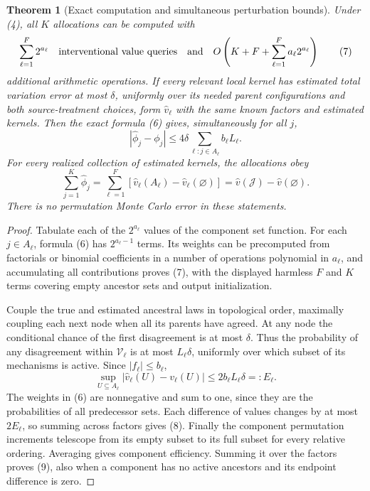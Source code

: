 \documentclass[11pt]{article}
\newtheorem{theorem}{Theorem}
\theoremstyle{definition}
\begin{document}
\begin{theorem}[Exact computation and simultaneous perturbation bounds]
Under (4), all $K$ allocations can be computed with
\[
 \sum_{\ell=1}^F 2^{a_\ell}\quad\hbox{interventional value queries}
 \quad\hbox{and}\quad
 O\left(K+F+\sum_{\ell=1}^F a_\ell2^{a_\ell}\right)
                                                        \tag{7}
\]
additional arithmetic operations. If every relevant local kernel has
estimated total variation error at most $\delta$, uniformly over its
needed parent configurations and both source-treatment choices, form
$\widehat v_\ell$ with the same known factors and estimated kernels.
Then the exact formula (6) gives, simultaneously for all $j$,
\[
 |\widehat\phi_j-\phi_j|
 \le4\delta\sum_{\ell:j\in A_\ell}b_\ell L_\ell.    \tag{8}
\]
For every realized collection of estimated kernels, the allocations obey
\[
 \sum_{j=1}^K\widehat\phi_j
 =\sum_{\ell=1}^F[\widehat v_\ell(A_\ell)
                         -\widehat v_\ell(\varnothing)]
 =\widehat v(\mathcal J)-\widehat v(\varnothing).       \tag{9}
\]
There is no permutation Monte Carlo error in these statements.
\end{theorem}
\begin{proof}
Tabulate each of the $2^{a_\ell}$ values of the component set function.
For each $j\in A_\ell$, formula (6) has $2^{a_\ell-1}$ terms.
Its weights can be precomputed from factorials or binomial coefficients
in a number of operations polynomial in $a_\ell$, and accumulating
all contributions proves (7), with the displayed harmless $F$ and $K$
terms covering empty ancestor sets and output initialization.

Couple the true and estimated ancestral laws in topological order,
maximally coupling each next node when all its parents have agreed.
At any node the conditional chance of the first disagreement is at
most $\delta$. Thus the probability of any disagreement within
$\mathcal V_\ell$ is at most $L_\ell\delta$, uniformly over which
subset of its mechanisms is active. Since $|f_\ell|\le b_\ell$,
\[
 \sup_{U\subseteq A_\ell}|\widehat v_\ell(U)-v_\ell(U)|
 \le 2b_\ell L_\ell\delta=:E_\ell.                  \tag{10}
\]
The weights in (6) are nonnegative and sum to one, since they are the
probabilities of all predecessor sets. Each difference of values changes
by at most $2E_\ell$, so summing across factors gives (8).
Finally the component permutation increments telescope from its empty
subset to its full subset for every relative ordering. Averaging gives
component efficiency. Summing it over the factors proves (9), also when
a component has no active ancestors and its endpoint difference is zero.
\end{proof}
\end{document}
